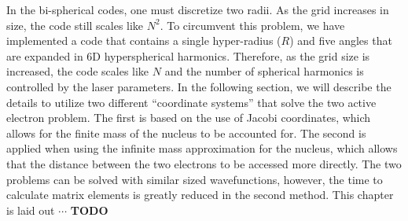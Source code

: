In the bi-spherical codes, one must discretize two radii. As the grid increases in size, the code still scales like $N^2$. To circumvent this problem, we have implemented a code that contains a single hyper-radius ($R$) and five angles that are expanded in 6D hyperspherical harmonics. Therefore, as the grid size is increased, the code scales like $N$ and the number of spherical harmonics is controlled by the laser parameters. In the following section, we will describe the details to utilize two different ``coordinate systems'' that solve the two active electron problem. The first is based on the use of Jacobi coordinates, which allows for the finite mass of the nucleus to be accounted for. The second is applied when using the infinite mass approximation for the nucleus, which allows that the distance between the two electrons to be accessed more directly. The two problems can be solved with similar sized wavefunctions, however, the time to calculate matrix elements is greatly reduced in the second method. This chapter is laid out $\cdots$ \textbf{TODO}

